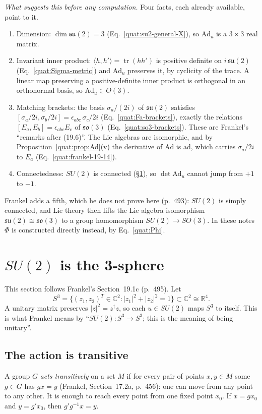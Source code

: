 \emph{What suggests this before any computation.} Four facts, each already
available, point to it.
\begin{enumerate}
 \item Dimension: $\dim\mathfrak{su}(2)=3$ (Eq.~\eqref{quat:su2-general-X}),
  so $\mathrm{Ad}_u$ is a $3\times3$ real matrix.
 \item Invariant inner product: $\langle h,h'\rangle=\operatorname{tr}(hh')$
  is positive definite on $i\,\mathfrak{su}(2)$ (Eq.~\eqref{quat:Sigma-metric})
  and $\mathrm{Ad}_u$ preserves it, by cyclicity of the trace. A linear map
  preserving a positive-definite inner product is orthogonal in an
  orthonormal basis, so $\mathrm{Ad}_u\in O(3)$.
 \item Matching brackets: the basis $\sigma_a/(2i)$ of $\mathfrak{su}(2)$
  satisfies $[\sigma_a/2i,\sigma_b/2i]=\epsilon_{abc}\,\sigma_c/2i$
  (Eq.~\eqref{quat:Fa-brackets}), exactly the relations
  $[E_a,E_b]=\epsilon_{abc}E_c$ of $\mathfrak{so}(3)$
  (Eq.~\eqref{quat:so3-brackets}). These are Frankel's ``remarks after
  (19.6)''. The Lie algebras are isomorphic, and by
  Proposition~\ref{quat:prop:Ad}(v) the derivative of $\mathrm{Ad}$ is
  $\mathrm{ad}$, which carries $\sigma_a/2i$ to $E_a$
  (Eq.~\eqref{quat:frankel-19-14}).
 \item Connectedness: $SU(2)$ is connected (\S\ref{quat:sec:su2-sphere}),
  so $\det\mathrm{Ad}_u$ cannot jump from $+1$ to $-1$.
\end{enumerate}
Frankel adds a fifth, which he does not prove here (p.~493): $SU(2)$ is
simply connected, and Lie theory then lifts the Lie algebra isomorphism
$\mathfrak{su}(2)\cong\mathfrak{so}(3)$ to a group homomorphism
$SU(2)\to SO(3)$. In these notes $\Phi$ is constructed directly instead, by
Eq.~\eqref{quat:Phi}.

\section{\texorpdfstring{$SU(2)$}{SU(2)} is the 3-sphere}\label{quat:sec:su2-sphere}
This section follows Frankel's Section~19.1c (p.~495). Let
\begin{equation}
 S^3=\{(z_1,z_2)^T\in\mathbb C^2:|z_1|^2+|z_2|^2=1\}\subset\mathbb C^2\cong\mathbb R^4 .
\end{equation}
A unitary matrix preserves $|z|^2=z^\dagger z$, so each $u\in SU(2)$ maps
$S^3$ to itself. This is what Frankel means by ``$SU(2)\colon S^3\to S^3$;
this is the meaning of being unitary''.

\subsection{The action is transitive}
A group $G$ \emph{acts transitively} on a set $M$ if for every pair of
points $x,y\in M$ some $g\in G$ has $gx=y$ (Frankel, Section~17.2a,
p.~456): one can move from any point to any other. It is enough to reach
every point from one fixed point $x_0$. If $x=gx_0$ and $y=g'x_0$, then
$g'g^{-1}x=y$.

